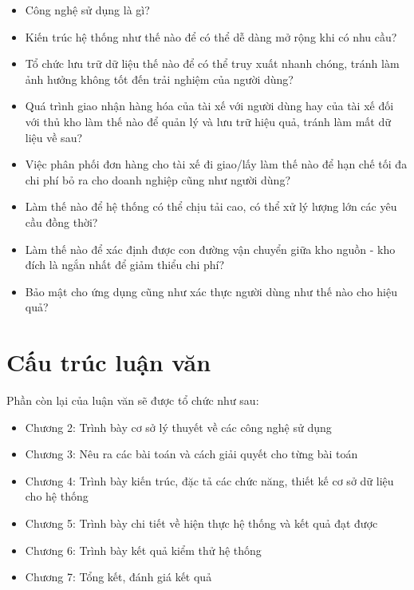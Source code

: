 	    \begin{itemize}
                \item Công nghệ sử dụng là gì?
                \item Kiến trúc hệ thống như thế nào để có thể dễ dàng mở rộng khi có nhu cầu?
                \item Tổ chức lưu trữ dữ liệu thế nào để có thể truy xuất nhanh chóng, tránh làm ảnh hưởng không tốt đến trải nghiệm của người dùng? 
                \item Quá trình giao nhận hàng hóa của tài xế với người dùng hay của tài xế đối với thủ kho làm thế nào để quản lý và lưu trữ hiệu quả, tránh làm mất dữ liệu về sau?
                \item Việc phân phối đơn hàng cho tài xế đi giao/lấy làm thế nào để hạn chế tối đa chi phí bỏ ra cho doanh nghiệp cũng như người dùng?
                \item Làm thế nào để hệ thống có thể chịu tải cao, có thể xử lý lượng lớn các yêu cầu đồng thời? 
                \item Làm thế nào để xác định được con đường vận chuyển giữa kho nguồn - kho đích là ngắn nhất để giảm thiểu chi phí? 
                \item Bảo mật cho ứng dụng cũng như xác thực người dùng như thế nào cho hiệu quả?
            \end{itemize}
	    
	
	\section{Cấu trúc luận văn}
	 
	 Phần còn lại của luận văn sẽ được tổ chức như sau:
	 \begin{itemize}
                \item Chương 2: Trình bày cơ sở lý thuyết về các công nghệ sử dụng
                \item Chương 3: Nêu ra các bài toán và cách giải quyết cho từng bài toán
                \item Chương 4: Trình bày kiến trúc, đặc tả các chức năng, thiết kế cơ sở dữ liệu cho hệ thống
                \item Chương 5: Trình bày chi tiết về hiện thực hệ thống và kết quả đạt được
                \item Chương 6: Trình bày kết quả kiểm thử hệ thống
                \item Chương 7: Tổng kết, đánh giá kết quả
            \end{itemize}